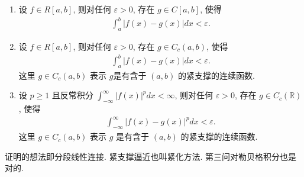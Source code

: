 \documentclass[../../main.tex]{subfiles}
\begin{document}
\begin{theorem}[可积被连续函数逼近]\label{theorem:可积被连续函数逼近}
\begin{enumerate}[(1)]
\item 设 $f \in R[a,b]$, 则对任何 $\varepsilon > 0$, 存在 $g \in C[a,b]$, 使得
\begin{align}
\int_{a}^{b} |f(x) - g(x)|dx < \varepsilon. \label{theorem:可积被连续函数逼近-13.117}
\end{align}

\item 设 $f \in R[a,b]$, 则对任何 $\varepsilon > 0$, 存在 $g \in C_c(a,b)$, 使得
\begin{align*}
\int_{a}^{b} |f(x) - g(x)|dx < \varepsilon. 
\end{align*}
这里 $g\in C_c(a,b)$ 表示 $g$是有含于 $(a,b)$ 的紧支撑的连续函数.

\item 设 $p \geqslant 1$ 且反常积分 $\int_{-\infty}^{\infty} |f(x)|^{p}dx < \infty$, 则对任何 $\varepsilon > 0$, 存在 $g \in C_c(\mathbb{R})$, 使得
\begin{align*}
\int_{-\infty}^{\infty} |f(x) - g(x)|^{p}dx < \varepsilon.
\end{align*}
这里 $g\in C_c(a,b)$ 表示 $g$ 是有含于 $(a,b)$ 的紧支撑的连续函数.
\end{enumerate}
\end{theorem}
\begin{note}
证明的想法即分段线性连接. 紧支撑逼近也叫紧化方法. 第三问对勒贝格积分也是对的.
\end{note}
\end{document}
